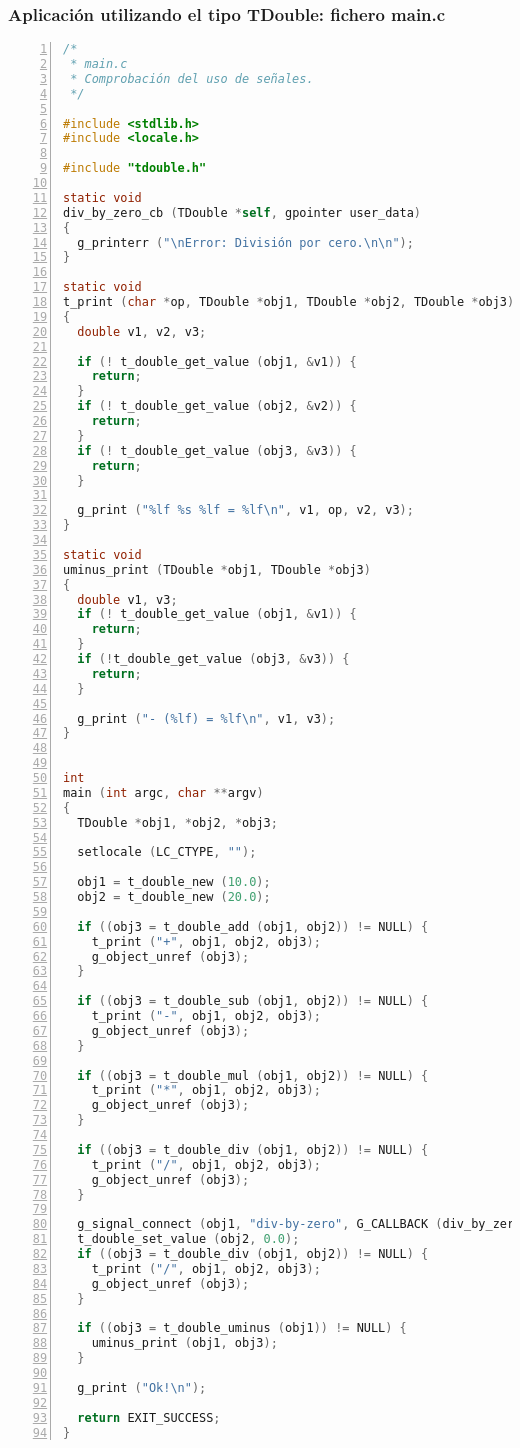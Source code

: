 \subsubsection{Aplicación utilizando el tipo \textsf{TDouble}: fichero \textsf{main.c}}
\begin{lstlisting}[language=C, numbers=left]
/*
 * main.c
 * Comprobación del uso de señales.
 */

#include <stdlib.h>
#include <locale.h>

#include "tdouble.h"

static void
div_by_zero_cb (TDouble *self, gpointer user_data)
{
  g_printerr ("\nError: División por cero.\n\n");
}

static void
t_print (char *op, TDouble *obj1, TDouble *obj2, TDouble *obj3)
{
  double v1, v2, v3;

  if (! t_double_get_value (obj1, &v1)) {
    return;
  }
  if (! t_double_get_value (obj2, &v2)) {
    return;
  }
  if (! t_double_get_value (obj3, &v3)) {
    return;
  }

  g_print ("%lf %s %lf = %lf\n", v1, op, v2, v3);
}

static void
uminus_print (TDouble *obj1, TDouble *obj3)
{
  double v1, v3;
  if (! t_double_get_value (obj1, &v1)) {
    return;
  }
  if (!t_double_get_value (obj3, &v3)) {
    return;
  }
  
  g_print ("- (%lf) = %lf\n", v1, v3); 
}


int
main (int argc, char **argv)
{
  TDouble *obj1, *obj2, *obj3;

  setlocale (LC_CTYPE, "");

  obj1 = t_double_new (10.0);
  obj2 = t_double_new (20.0);

  if ((obj3 = t_double_add (obj1, obj2)) != NULL) {
    t_print ("+", obj1, obj2, obj3);
    g_object_unref (obj3);
  }

  if ((obj3 = t_double_sub (obj1, obj2)) != NULL) {
    t_print ("-", obj1, obj2, obj3);
    g_object_unref (obj3);
  }

  if ((obj3 = t_double_mul (obj1, obj2)) != NULL) {
    t_print ("*", obj1, obj2, obj3);
    g_object_unref (obj3);
  }
 
  if ((obj3 = t_double_div (obj1, obj2)) != NULL) {
    t_print ("/", obj1, obj2, obj3);
    g_object_unref (obj3);
  }

  g_signal_connect (obj1, "div-by-zero", G_CALLBACK (div_by_zero_cb), NULL);
  t_double_set_value (obj2, 0.0);
  if ((obj3 = t_double_div (obj1, obj2)) != NULL) {
    t_print ("/", obj1, obj2, obj3);
    g_object_unref (obj3);
  }

  if ((obj3 = t_double_uminus (obj1)) != NULL) {
    uminus_print (obj1, obj3);
  }

  g_print ("Ok!\n");

  return EXIT_SUCCESS;
}
\end{lstlisting}

